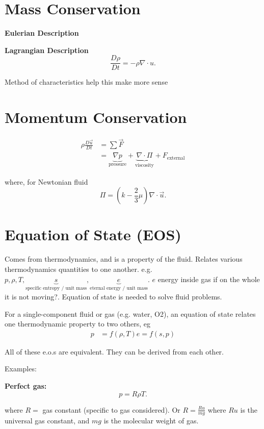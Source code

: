 
\subsectionfont{\fontsize{10}{10}\selectfont}

\section{Mass Conservation}%
\textbf{Eulerian Description} 

\textbf{Lagrangian Description} 
\[
\frac{D \rho}{Dt} = - \rho \nabla\cdot u
.\] 

Method of characteristics help this make more sense
\section{Momentum Conservation}%
\begin{align}
  \rho \frac{D \vec{u}}{Dt} &= \sum \vec{F} \\
                            &= \underbrace{\nabla p}_\text{pressure}
                            + \underbrace{\nabla\cdot \Pi}_\text{viscosity} + F_{\text{external}}
\end{align}

where, for Newtonian fluid
\[
  \Pi = (k - \frac{2}{3}\mu)\nabla\cdot \vec{u}
.\] 
\section{Equation of State (EOS)}%

Comes from thermodynamics, and is a property of
the fluid. Relates various thermodynamics quantities to one another. e.g. $p,
\rho, T, \underbrace{s}_\text{specific entropy / unit mass},
\underbrace{e}_\text{eternal energy / unit mass}$. $e$ energy inside gas if on
the whole it is not moving?. Equation of state is needed to solve fluid
problems.

For a single-component fluid or gas (e.g. water, O2), an equation of state
relates one thermodynamic property to two others, eg
\begin{align*}
  p &= f( \rho, T)
  e = f(s, p)
\end{align*}

All of these e.o.s are equivalent. They can be derived from each other.


Examples:

\textbf{Perfect gas:} 
\[
p = R \rho T
.\] 

where $R = $ gas constant (specific to gas considered). Or  $R = \frac{Ru}{mg}$
where $Ru$ is the universal gas constant, and $mg$ is the molecular weight of
gas.

